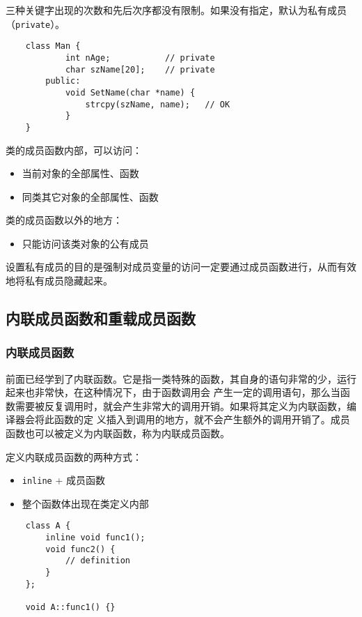 \documentclass[UTF8]{ctexart}
\begin{document}
三种关键字出现的次数和先后次序都没有限制。如果没有指定，默认为私有成员（\texttt{private}）。
\begin{verbatim}
    class Man {
            int nAge;           // private
            char szName[20];    // private
        public:
            void SetName(char *name) {
                strcpy(szName, name);   // OK
            }
    }
\end{verbatim}

类的成员函数内部，可以访问：
\begin{itemize}
    \item 当前对象的全部属性、函数
    \item 同类其它对象的全部属性、函数
\end{itemize}

类的成员函数以外的地方：
\begin{itemize}
    \item 只能访问该类对象的公有成员
\end{itemize}

设置私有成员的目的是强制对成员变量的访问一定要通过成员函数进行，从而有效地将私有成员隐藏起来。

\subsection{内联成员函数和重载成员函数}
\subsubsection{内联成员函数}
前面已经学到了内联函数。它是指一类特殊的函数，其自身的语句非常的少，运行起来也非常快，在这种情况下，由于函数调用会
产生一定的调用语句，那么当函数需要被反复调用时，就会产生非常大的调用开销。如果将其定义为内联函数，编译器会将此函数的定
义插入到调用的地方，就不会产生额外的调用开销了。成员函数也可以被定义为内联函数，称为内联成员函数。

定义内联成员函数的两种方式：
\begin{itemize}
    \item \texttt{inline} + 成员函数
    \item 整个函数体出现在类定义内部
\end{itemize}

\begin{verbatim}
    class A {
        inline void func1();
        void func2() {
            // definition
        }
    };

    void A::func1() {}
\end{verbatim}
\end{document}
